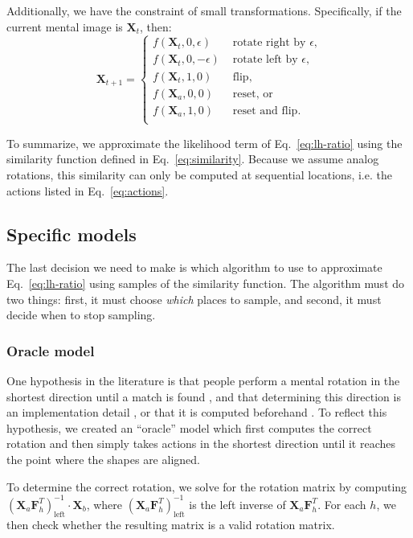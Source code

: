 \documentclass[10pt,letterpaper]{article}
\newcommand{\Xa}[0]{\mathbf{X}_a}
\newcommand{\Xb}[0]{\mathbf{X}_b}
\newcommand{\Xt}[0]{\mathbf{X}_t}
\newcommand{\F}[0]{\mathbf{F}}
\newcommand{\Oc}[0]{Oracle}
\begin{document}
Additionally, we have the constraint of small
transformations. Specifically, if the current mental image is $\Xt$,
then:
\begin{equation}
  \mathbf{X}_{t+1} = \left\{ \begin{array}{ll}
      f(\Xt, 0, \epsilon) &\mbox{ rotate right by $\epsilon$,} \\
      f(\Xt, 0, -\epsilon) &\mbox{ rotate left by $\epsilon$,} \\
      f(\Xt, 1, 0) &\mbox{ flip,} \\
      f(\Xa, 0, 0) &\mbox{ reset, or} \\
      f(\Xa, 1, 0) &\mbox{ reset and flip.} \\
    \end{array} \right.
  \label{eq:actions}
\end{equation}

To summarize, we approximate the likelihood term of
Eq.~\ref{eq:lh-ratio} using the similarity function defined in
Eq.~\ref{eq:similarity}. Because we assume analog rotations, this
similarity can only be computed at sequential locations, i.e. the
actions listed in Eq.~\ref{eq:actions}.

\subsection{Specific models}

The last decision we need to make is which algorithm to use to
approximate Eq.~\ref{eq:lh-ratio} using samples of the similarity
function. The algorithm must do two things: first, it must choose
\textit{which} places to sample, and second, it must decide when to
stop sampling.

\subsubsection{\Oc{} model}

One hypothesis in the literature is that people perform a mental
rotation in the shortest direction until a match is found
\cite{Shepard1971, Cooper:1975wp}, and that determining this direction
is an implementation detail \cite{Anderson1978}, or that it is
computed beforehand \cite{Funt:1983wn}.  To reflect this hypothesis,
we created an ``oracle'' model which first computes the correct
rotation and then simply takes actions in the shortest direction until
it reaches the point where the shapes are aligned.

To determine the correct rotation, we solve for the rotation matrix by
computing $(\Xa \F_h^T)_\mathrm{left}^{-1}\cdot{}\Xb$, where
$(\Xa\F_h^T)_\mathrm{left}^{-1}$ is the left inverse of
$\Xa\F_h^T$. For each $h$, we then check whether the resulting matrix
is a valid rotation matrix.
\end{document}
